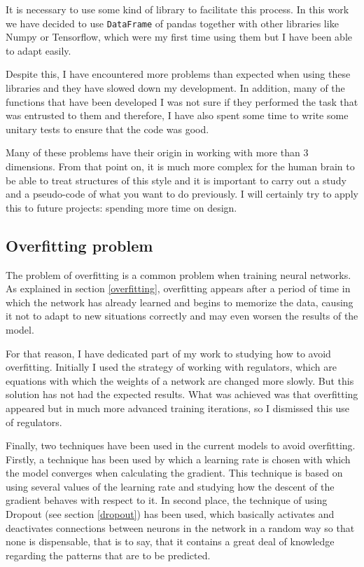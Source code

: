 It is necessary to use some kind of library to facilitate this process. In this work we have decided to use \small{\verb|DataFrame|} \normalsize of pandas together with other libraries like Numpy or Tensorflow, which were my first time using them but I have been able to adapt easily.
\newline


Despite this, I have encountered more problems than expected when using these libraries and they have slowed down my development. In addition, many of the functions that have been developed I was not sure if they performed the task that was entrusted to them and therefore, I have also spent some time to write some unitary tests to ensure that the code was good.
\newline

Many of these problems have their origin in working with more than 3 dimensions. From that point on, it is much more complex for the human brain to be able to treat structures of this style and it is important to carry out a study and a pseudo-code of what you want to do previously. I will certainly try to apply this to future projects: spending more time on design.



\subsection{Overfitting problem}

The problem of overfitting is a common problem when training neural networks. As explained in section \ref{overfitting}, overfitting appears after a period of time in which the network has already learned and begins to memorize the data, causing it not to adapt to new situations correctly and may even worsen the results of the model.
\newline

For that reason, I have dedicated part of my work to studying how to avoid overfitting. Initially I used the strategy of working with regulators, which are equations with which the weights of a network are changed more slowly. But this solution has not had the expected results. What was achieved was that overfitting appeared but in much more advanced training iterations, so I dismissed this use of regulators.
\newline

Finally, two techniques have been used in the current models to avoid overfitting. Firstly, a technique has been used by which a learning rate is chosen with which the model converges when calculating the gradient. This technique is based on using several values of the learning rate and studying how the descent of the gradient behaves with respect to it. In second place, the technique of using Dropout (see section \ref{dropout}) has been used, which basically activates and deactivates connections between neurons in the network in a random way so that none is dispensable, that is to say, that it contains a great deal of knowledge regarding the patterns that are to be predicted.
